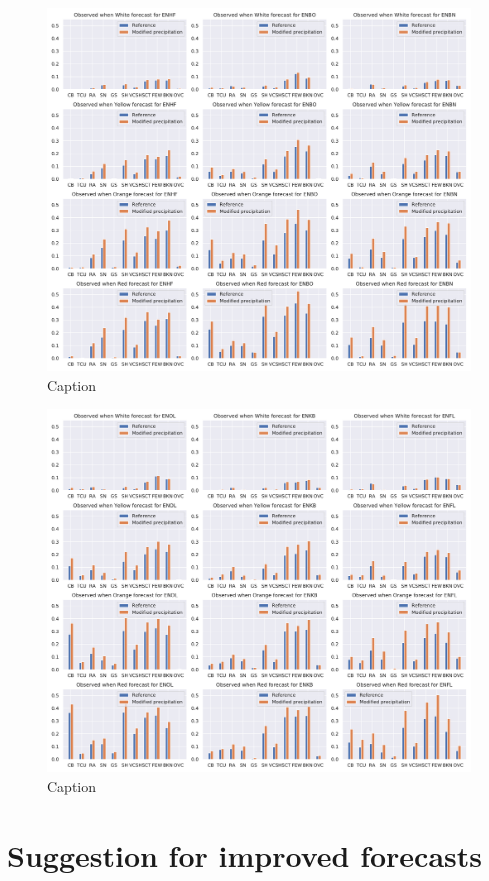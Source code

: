 \begin{figure}
    \centering
    \includegraphics[width=\textwidth]{Figures/HTIMetar1.pdf}
    \caption{Caption}
    \label{fig:HTIMETAR1}
\end{figure}

\begin{figure}
    \centering
    \includegraphics[width=\textwidth]{Figures/HTIMetar2.pdf}
    \caption{Caption}
    \label{fig:HTIMETAR2}
\end{figure}


\section{Suggestion for improved forecasts}

